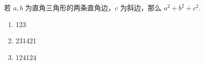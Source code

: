 \begin{definition}[勾股定理]
    若 $a,b$ 为直角三角形的两条直角边，$c$ 为斜边，那么 $a^2 + b^2 + c^2.$
\end{definition}



\begin{texcode}[]{}
  \begin{enumerate}
    \item 123
    \item 231421
    \item 124124
  \end{enumerate}
\end{texcode}



\zhlipsum[1]


\zhlipsum[2]


\zhlipsum[3]
